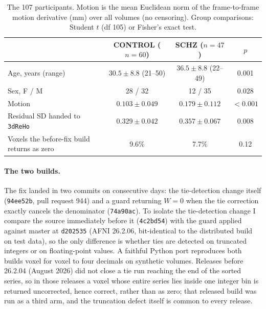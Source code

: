 \documentclass[11pt]{article}
\newcommand{\code}[1]{\texttt{#1}}
\begin{document}
\begin{table}[t]
\centering\small
\caption{The 107 participants. Motion is the mean Euclidean norm of the frame-to-frame motion derivative (mm) over all volumes (no censoring). Group comparisons: Student $t$ (df 105) or Fisher's exact test.}
\label{tab:demo}
\begin{tabular}{@{}lccc@{}}
\toprule
 & CONTROL ($n = 60$) & SCHZ ($n = 47$) & $p$ \\
\midrule
Age, years (range) & $30.5 \pm 8.8$ (21--50) & $36.5 \pm 8.8$ (22--49) & 0.001 \\
Sex, F / M & 28 / 32 & 12 / 35 & 0.028 \\
Motion & $0.103 \pm 0.049$ & $0.179 \pm 0.112$ & $<0.001$ \\
Residual SD handed to \code{3dReHo} & $0.329 \pm 0.042$ & $0.357 \pm 0.067$ & 0.008 \\
Voxels the before-fix build returns as zero & 9.6\% & 7.7\% & 0.12 \\
\bottomrule
\end{tabular}
\end{table}

\paragraph{The two builds.} The fix landed in two commits on consecutive days: the tie-detection change itself (\code{94ee52b}, pull request 944) and a guard returning $W = 0$ when the tie correction exactly cancels the denominator (\code{74a90ac}). To isolate the tie-detection change I compare the source immediately before it (\code{4c2bd54}) with the guard applied against master at \code{d202535} (AFNI 26.2.06, bit-identical to the distributed build on test data), so the only difference is whether ties are detected on truncated integers or on floating-point values. A faithful Python port reproduces both builds voxel for voxel to four decimals on synthetic volumes. Releases before 26.2.04 (August 2026) did not close a tie run reaching the end of the sorted series, so in those releases a voxel whose entire series lies inside one integer bin is returned uncorrected, hence correct, rather than as zero; that released build was run as a third arm, and the truncation defect itself is common to every release.
\end{document}
